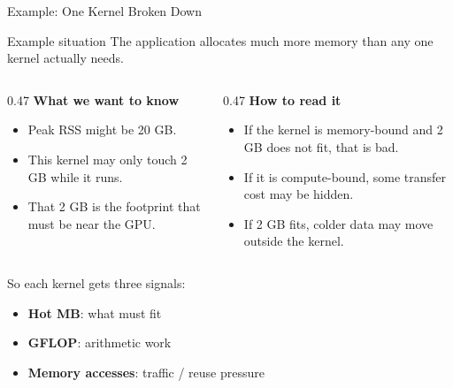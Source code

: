 \documentclass[aspectratio=169]{beamer}
\begin{document}
\begin{frame}{Example: One Kernel Broken Down}
  \begin{block}{Example situation}
    The application allocates much more memory than any one kernel actually needs.
  \end{block}

  \vspace{0.5em}
  \begin{columns}[T,totalwidth=\textwidth]
    \begin{column}{0.47\textwidth}
      \textbf{What we want to know}
      \begin{itemize}
        \item Peak RSS might be 20 GB.
        \item This kernel may only touch 2 GB while it runs.
        \item That 2 GB is the footprint that must be near the GPU.
      \end{itemize}
    \end{column}
    \begin{column}{0.47\textwidth}
      \textbf{How to read it}
      \begin{itemize}
        \item If the kernel is memory-bound and 2 GB does not fit, that is bad.
        \item If it is compute-bound, some transfer cost may be hidden.
        \item If 2 GB fits, colder data may move outside the kernel.
      \end{itemize}
    \end{column}
  \end{columns}

  \vspace{0.5em}
  So each kernel gets three signals:
  \begin{itemize}
    \item \textbf{Hot MB}: what must fit
    \item \textbf{GFLOP}: arithmetic work
    \item \textbf{Memory accesses}: traffic / reuse pressure
  \end{itemize}
\end{frame}
\end{document}
